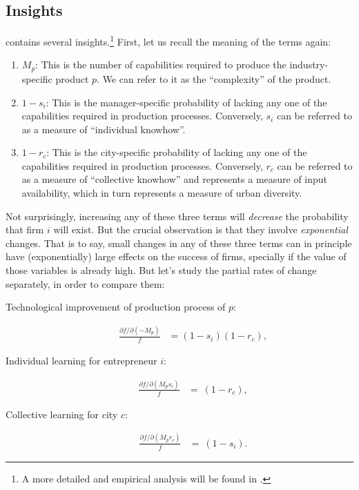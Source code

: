 \documentclass[12pt]{article}
\begin{document}
\subsection{Insights}
 contains several insights.\footnote{A more detailed and empirical analysis will be found in \citet{drivers}.} First, let us recall the meaning of the terms again:
\begin{enumerate}
	\item $M_p$: This is the number of capabilities required to produce the industry-specific product $p$. We can refer to it as the ``complexity'' of the product.
	\item $1-s_i$: This is the manager-specific probability of lacking any one of the capabilities required in production processes. Conversely, $s_i$ can be referred to as a measure of ``individual knowhow''.
	\item $1-r_c$: This is the city-specific probability of lacking any one of the capabilities required in production processes. Conversely, $r_c$ can be referred to as a measure of ``collective knowhow'' and represents a measure of input availability, which in turn represents a measure of urban diversity.	
\end{enumerate}
Not surprisingly, increasing any of these three terms will \emph{decrease} the probability that firm $i$ will exist. But the crucial observation is that they involve \emph{exponential} changes. That is to say, small changes in any of these three terms can in principle have (exponentially) large effects on the success of firms, specially if the value of those variables is already high. But let's study the partial rates of change separately, in order to compare them:
\begin{description}
	\item[Technological improvement of production process of $p$:]
	\begin{align}
		\frac{\partial f/\partial (-M_p)}{f}&= (1-s_i)(1-r_c), \label{eq_Mp}
	\end{align}
	
	\item[Individual learning for entrepreneur $i$:]
	\begin{align}
		\frac{\partial f/\partial (M_p s_i)}{f}&= ~ (1-r_c), \label{eq_si}
	\end{align}
	
	\item[Collective learning for city $c$:]
	\begin{align}
		\frac{\partial f/\partial (M_p r_c)}{f}&= ~ (1-s_i) \label{eq_rc}.
	\end{align}
\end{description}
\end{document}
